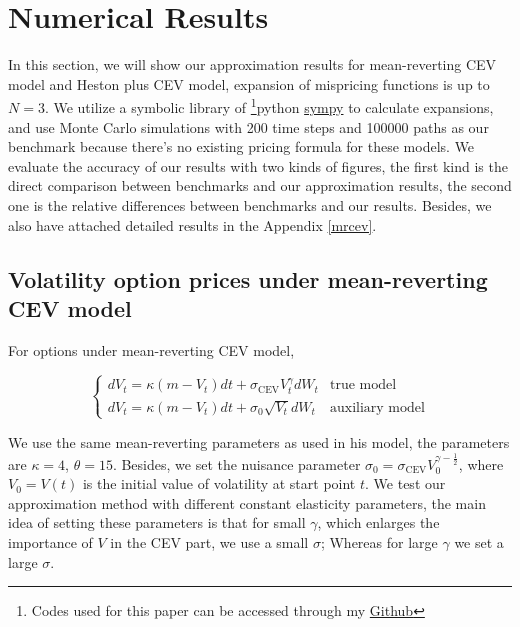 \chapter{Numerical Results}\label{ch4}

In this section, we will show our approximation results for mean-reverting CEV model and Heston plus CEV model, expansion of mispricing functions is up to $N=3$. We utilize a symbolic library of \footnote{Codes used for this paper can be accessed through my   \href{https://github.com/ywang408/master-thesis-code}{Github}}{python} \href{https://www.sympy.org/en/index.html}{sympy} to calculate expansions, and use Monte Carlo simulations with 200 time steps and 100000 paths as our benchmark because there's no existing pricing formula for these models. We evaluate the accuracy of our results with two kinds of figures, the first kind is the direct comparison between benchmarks and our approximation results, the second one is the relative differences between benchmarks and our results. Besides, we also have attached detailed results in the Appendix \ref{mrcev}.

\section{Volatility option prices under mean-reverting CEV model}

For options under mean-reverting CEV model,

$$
  \begin{cases}
    d V_t=\kappa(m- V_t) d t+\sigma_{\text{CEV}} V^{\gamma}_t d W_t &\text{true model}\\
    d V_t=\kappa(m - V_t) d t+\sigma_0 \sqrt{V_t} d W_t &\text{auxiliary model}
  \end{cases}
$$

We use the same mean-reverting parameters as \cite{grunbichler_valuing_1996} used in his model, the parameters are $\kappa=4$, $\theta=15$. Besides, we set the nuisance parameter $\sigma_0 = \sigma_{\text{CEV}} V_0^{\gamma-\frac{1}{2}}$, where $V_0=V(t)$ is the initial value of volatility at start point $t$. We test our approximation method with different constant elasticity parameters, the main idea of setting these parameters is that for small $\gamma$, which enlarges the importance of $V$ in the CEV part, we use a small $\sigma$; Whereas for large $\gamma$ we set a large $\sigma$. 


